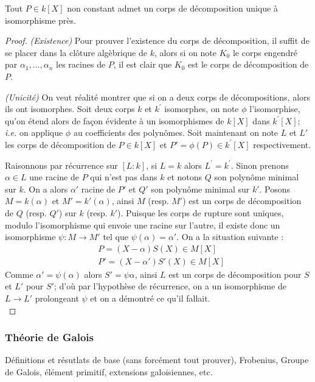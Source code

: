 \documentclass[a4paper]{article} %
\numberwithin{equation}{section}
\begin{document}
\begin{thm}
\label{cordec}
Tout $P\in k[X]$ non constant admet un corps de décomposition unique à 
isomorphisme près.
\end{thm}
\begin{proof}
\textit{(Existence)}
Pour prouver l'existence du corps de décomposition, il suffit de se placer 
dans la clôture algèbrique de $k$, alors si on note $K_0$ le corps engendré 
par $\alpha_1,\dots,\alpha_n$ les racines de $P$, il est clair que $K_0$ est 
le corps de décomposition de $P$.\par
\textit{(Unicité)}
On veut réalité montrer que si on a deux corps de décompositions, alors ils ont
isomorphes. Soit deux corps $k$ et $k^{\prime}$ isomorphes, on note $\phi$
l'isomorphise, qu'on étend alors de façon évidente à un isomorphismes de $k[X]$ 
dans $k^{\prime}[X]$; \textit{i.e.} on applique $\phi$ au coefficients des 
polynômes. Soit maintenant on note $L$ et $L'$ les corps de décomposition 
de $P\in k[X]$ et $P' = \phi(P) \in k^{\prime}[X]$ respectivement.\par
Raisonnons par récurrence sur $[L:k]$, si $L = k$ alors $L^{\prime} =
k^{\prime}$. Sinon prenons $\alpha\in L$ une racine de $P$ qui n'est pas dans
$k$ et notons $Q$ son polynôme minimal sur $k$. On a alors $\alpha'$ racine de 
$P'$ et $Q'$ son polynôme minimal sur $k'$. Posons $M = k(\alpha)$ et $M' =
k'(\alpha)$, ainsi $M$ (resp. $M'$) est un corps de décomposition de $Q$ (resp.
$Q'$) sur $k$ (resp. $k'$). Puisque les corps de rupture sont uniques, modulo
l'isomorphisme qui envoie une racine sur l'autre, il existe donc un isomorphisme
$\psi : M \to M'$ tel que $\psi(\alpha) = \alpha'$. On a la situation suivante :
\begin{align*}
&P = (X - \alpha)S(X)\in M[X]\\
&P' = (X - \alpha')S'(X)\in M[X]
\end{align*}
Comme $\alpha' = \psi(\alpha)$ alors $S'=\psi{\alpha}$, ainsi $L$ est un corps
de décomposition pour $S$ et $L'$ pour $S'$; d'où par l'hypothèse de récurrence,
on a un isomorphisme de $L \to L'$ prolongeant $\psi$ et on a démontré ce qu'il
fallait.\\
\end{proof}

\subsubsection{Théorie de Galois}
Définitions et résutlats de base (sans forcément tout prouver), Frobenius, 
Groupe de Galois, élément primitif, extensions galoisiennes, etc.
\end{document}
